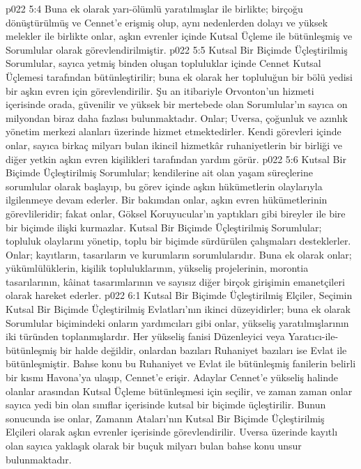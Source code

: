 \vs p022 5:4 Buna ek olarak yarı\hyp{}ölümlü yaratılmışlar ile birlikte; birçoğu dönüştürülmüş ve Cennet’e erişmiş olup, aynı nedenlerden dolayı ve yüksek melekler ile birlikte onlar, aşkın evrenler içinde Kutsal Üçleme ile bütünleşmiş ve Sorumlular olarak görevlendirilmiştir.
\vs p022 5:5 Kutsal Bir Biçimde Üçleştirilmiş Sorumlular, sayıca yetmiş binden oluşan topluluklar içinde Cennet Kutsal Üçlemesi tarafından bütünleştirilir; buna ek olarak her topluluğun bir bölü yedisi bir aşkın evren için görevlendirilir. Şu an itibariyle Orvonton’un hizmeti içerisinde orada, güvenilir ve yüksek bir mertebede olan Sorumlular’ın sayıca on milyondan biraz daha fazlası bulunmaktadır. Onlar; Uversa, çoğunluk ve azınlık yönetim merkezi alanları üzerinde hizmet etmektedirler. Kendi görevleri içinde onlar, sayıca birkaç milyarı bulan ikincil hizmetkâr ruhaniyetlerin bir birliği ve diğer yetkin aşkın evren kişilikleri tarafından yardım görür.
\vs p022 5:6 Kutsal Bir Biçimde Üçleştirilmiş Sorumlular; kendilerine ait olan yaşam süreçlerine sorumlular olarak başlayıp, bu görev içinde aşkın hükümetlerin olaylarıyla ilgilenmeye devam ederler. Bir bakımdan onlar, aşkın evren hükümetlerinin görevlileridir; fakat onlar, Göksel Koruyucular’ın yaptıkları gibi bireyler ile bire bir biçimde ilişki kurmazlar. Kutsal Bir Biçimde Üçleştirilmiş Sorumlular; topluluk olaylarını yönetip, toplu bir biçimde sürdürülen çalışmaları desteklerler. Onlar; kayıtların, tasarıların ve kurumların sorumlularıdır. Buna ek olarak onlar; yükümlülüklerin, kişilik topluluklarının, yükseliş projelerinin, morontia tasarılarının, kâinat tasarımlarının ve sayısız diğer birçok girişimin emanetçileri olarak hareket ederler.
\vs p022 6:1 Kutsal Bir Biçimde Üçleştirilmiş Elçiler, Seçimin Kutsal Bir Biçimde Üçleştirilmiş Evlatları’nın ikinci düzeyidirler; buna ek olarak Sorumlular biçimindeki onların yardımcıları gibi onlar, yükseliş yaratılmışlarının iki türünden toplanmışlardır. Her yükseliş fanisi Düzenleyici veya Yaratıcı\hyp{}ile\hyp{}bütünleşmiş bir halde değildir, onlardan bazıları Ruhaniyet bazıları ise Evlat ile bütünleşmiştir. Bahse konu bu Ruhaniyet ve Evlat ile bütünleşmiş fanilerin belirli bir kısmı Havona’ya ulaşıp, Cennet’e erişir. Adaylar Cennet’e yükseliş halinde olanlar arasından Kutsal Üçleme bütünleşmesi için seçilir, ve zaman zaman onlar sayıca yedi bin olan sınıflar içerisinde kutsal bir biçimde üçleştirilir. Bunun sonucunda ise onlar, Zamanın Ataları’nın Kutsal Bir Biçimde Üçleştirilmiş Elçileri olarak aşkın evrenler içerisinde görevlendirilir. Uversa üzerinde kayıtlı olan sayıca yaklaşık olarak bir buçuk milyarı bulan bahse konu unsur bulunmaktadır.
